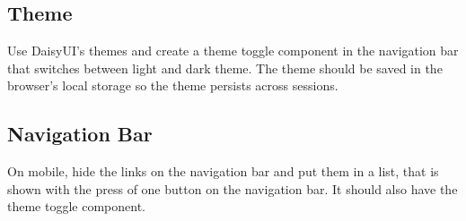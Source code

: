 \documentclass[12pt, letterpaper]{article}
\begin{document}
\subsection{Theme}

Use DaisyUI's themes and create a theme toggle component in the navigation bar that switches between light and dark theme. The theme should be saved in the browser's local storage so the theme persists across sessions.

\subsection{Navigation Bar}

On mobile, hide the links on the navigation bar and put them in a list, that is shown with the press of one button on the navigation bar. It should also have the theme toggle component.
\end{document}
